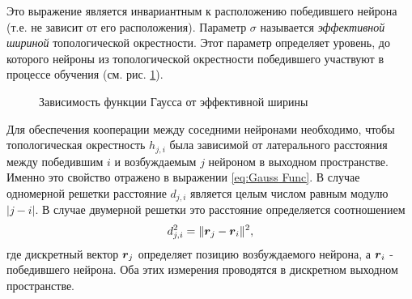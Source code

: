 \documentclass[a4paper,12pt]{report}
\begin{document}
Это выражение является инвариантным к расположению победившего
нейрона (т.е. не зависит от его расположения). Параметр $\sigma$
называется \textit{эффективной шириной} топологической окрестности.
Этот параметр определяет уровень, до которого нейроны из
топологической окрестности победившего участвуют в процессе обучения
(см. рис. \ref{fig:effective width}).
\begin{figure}
    \centering
    \caption{Зависимость функции Гаусса от эффективной ширины}
    \label{fig:effective width}
\end{figure}

Для обеспечения кооперации между соседними нейронами необходимо, чтобы
топологическая окрестность $h_{j,i}$ была зависимой от латерального
расстояния между победившим $i$ и возбуждаемым $j$ нейроном в выходном
пространстве. Именно это свойство отражено в выражении \eqref{eq:Gauss Func}.
В случае одномерной решетки расстояние $d_{j,i}$ является целым
числом равным модулю $\left| j-i\right|$. В случае двумерной решетки
это расстояние определяется соотношением
\begin{equation}
    d_{j,i}^{2} = \lVert\boldsymbol{r}_j - \boldsymbol{r}_i\rVert^2,
\end{equation}
где дискретный вектор $\boldsymbol{r}_j$ определяет позицию возбуждаемого
нейрона, а $\boldsymbol{r}_i$ - победившего нейрона. Оба этих измерения
проводятся в дискретном выходном пространстве.
\end{document}
